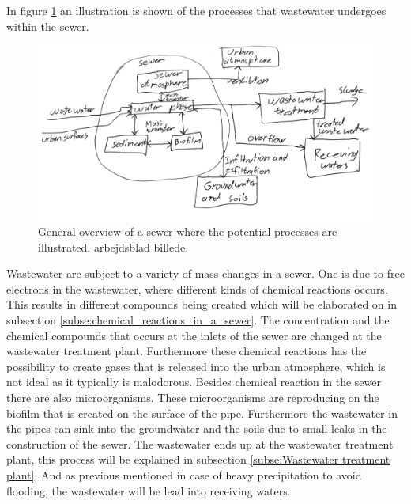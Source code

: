 In figure \ref{fig:sewer_overview_of_the_chemical_process} an illustration is shown of the processes that wastewater undergoes within the sewer.
\begin{figure}[H]
\centering
\includegraphics[width=1\textwidth]{report/introduction/pictures/detailed_sewer.pdf}
\caption{General overview of a sewer where the potential processes are illustrated. arbejdsblad billede. }
\label{fig:sewer_overview_of_the_chemical_process}
\end{figure}

Wastewater are subject to a variety of mass changes in a sewer. One is due to free electrons in the wastewater, where different kinds of chemical reactions occurs. This results in different compounds being created which will be elaborated on in subsection \ref{subse:chemical_reactions_in_a_sewer}. The concentration and the chemical compounds that occurs at the inlets of the sewer are changed at the wastewater treatment plant. Furthermore these chemical reactions has the possibility to create gases that is released into the urban atmosphere, which is not ideal as it typically is malodorous. Besides chemical reaction in the sewer there are also microorganisms. %
These microorganisms are reproducing on the biofilm that is created on the surface of the pipe. Furthermore the wastewater in the pipes can sink into the groundwater and the soils due to small leaks in the construction of the sewer. The wastewater ends up at the wastewater treatment plant, this process will be explained in subsection \ref{subse:Wastewater treatment plant}. And as previous mentioned in case of heavy precipitation to avoid flooding, the wastewater will be lead into receiving waters. 


